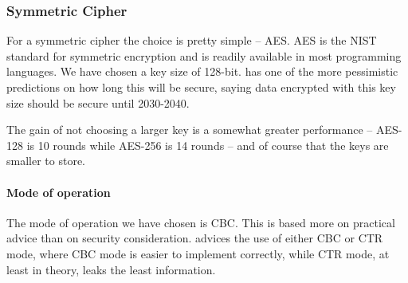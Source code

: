 \documentclass[pdftex,english,10pt,b5paper,twoside]{book}
\begin{document}








\subsubsection{Symmetric Cipher}

For a symmetric cipher the choice is pretty simple -- \ac{AES}. \ac{AES} is the
NIST standard for symmetric encryption and is readily available in most
programming languages. We have chosen a key size of 128-bit.
 \cite{ecrypt2_2010} has one of the more pessimistic
predictions on how long this will be secure, saying data encrypted with this
key size should be secure until 2030-2040.

The gain of not choosing a larger key is a somewhat greater
performance -- \ac{AES}-128 is 10 rounds while \ac{AES}-256 is 14
rounds -- and of course that the keys are smaller to store.

\paragraph{Mode of operation} The mode of operation we have chosen is \ac{CBC}.
This is based more on practical advice than on security consideration.
\citet{schneier} advices the use of either \ac{CBC} or \ac{CTR} mode, where
\ac{CBC} mode is easier to implement correctly, while \ac{CTR} mode, at least
in theory, leaks the least information.
\end{document}
